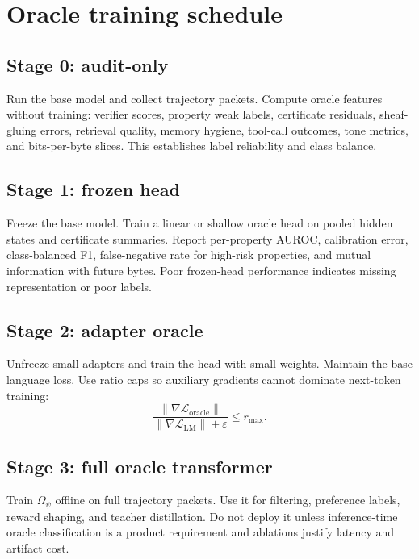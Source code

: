 \documentclass[11pt]{article}
\newcommand{\loss}{\mathcal{L}}
\newcommand{\eps}{\varepsilon}
\numberwithin{equation}{section}
\begin{document}
\section{Oracle training schedule}
\subsection{Stage 0: audit-only}
Run the base model and collect trajectory packets. Compute oracle features without training: verifier scores, property weak labels, certificate residuals, sheaf-gluing errors, retrieval quality, memory hygiene, tool-call outcomes, tone metrics, and bits-per-byte slices. This establishes label reliability and class balance.

\subsection{Stage 1: frozen head}
Freeze the base model. Train a linear or shallow oracle head on pooled hidden states and certificate summaries. Report per-property AUROC, calibration error, class-balanced F1, false-negative rate for high-risk properties, and mutual information with future bytes. Poor frozen-head performance indicates missing representation or poor labels.

\subsection{Stage 2: adapter oracle}
Unfreeze small adapters and train the head with small weights. Maintain the base language loss. Use ratio caps so auxiliary gradients cannot dominate next-token training:
\begin{equation}
\frac{\|\nabla\loss_{\mathrm{oracle}}\|}{\|\nabla\loss_{\mathrm{LM}}\|+\eps}\le r_{\max}.
\end{equation}

\subsection{Stage 3: full oracle transformer}
Train $\Omega_\psi$ offline on full trajectory packets. Use it for filtering, preference labels, reward shaping, and teacher distillation. Do not deploy it unless inference-time oracle classification is a product requirement and ablations justify latency and artifact cost.
\end{document}

